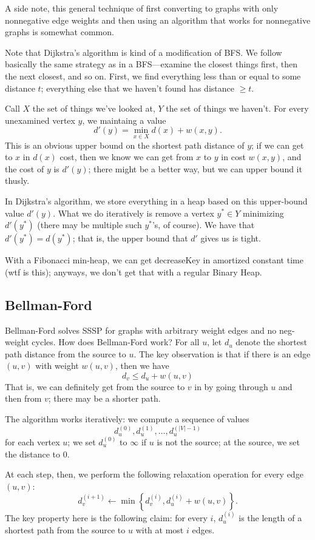 \documentclass{article}
\begin{document}
A side note, this general technique of first converting to graphs with only
nonnegative edge weights and then using an algorithm that works for nonnegative
graphs is somewhat common.


Note that Dijkstra's algorithm is kind of a modification of BFS.
We follow basically the same strategy as in a BFS---examine the closest things
first, then the next closest, and so on.
First, we find everything less than or equal to some distance $t$; everything
else that we haven't found has distance $\geq t$.

Call $X$ the set of things we've looked at, $Y$ the set of things we haven't.
For every unexamined vertex $y$, we maintaing a value
$$
d'(y) = \min_{x\in X} d(x) + w(x,y).
$$
This is an obvious upper bound on the shortest path distance of $y$; if we
can get to $x$ in $d(x)$ cost, then we know we can get from $x$ to $y$ in
cost $w(x,y)$, and the cost of $y$ is $d'(y)$; there might be a 
better way, but we can upper bound it thusly.

In Dijkstra's algorithm, we store everything in a heap based on this
upper-bound value $d'(y)$.
What we do iteratively is remove a vertex $y^*\in Y$ minimizing $d'(y^*)$ (there
may be multiple such $y^*$'s, of course).
We have that $d'(y^*) = d(y^*)$; that is, the upper bound that $d'$ gives
us is tight.

With a Fibonacci min-heap, we can get decreaseKey in amortized constant
time (wtf is this); anyways, we don't get that with a regular Binary Heap.


\subsection{Bellman-Ford}

Bellman-Ford solves SSSP for graphs with arbitrary weight edges and no
neg-weight cycles.
How does Bellman-Ford work?
For all $u$, let $d_u$ denote the shortest path distance from the source to
 $u$.
The key observation is that if there is an edge $(u,v)$ with weight $w(u,v)$,
then we have
$$
d_v \leq d_u + w(u,v)
$$
That is, we can definitely get from the source to $v$ in
by going through $u$ and then from $v$; there may be a shorter
path.

The algorithm works iteratively: we compute a sequence of values
$$
d_u^{(0)}, d_u^{(1)}, \ldots, d_u^{(|V| - 1)}
$$
for each vertex $u$; we set $d_u^{(0)}$ to $\infty$ if $u$ is not the
source; at the source, we set the distance to $0$.

At each step, then, we perform the following relaxation operation for
every edge $(u,v)$:
$$
	d_v^{(i+1)} \leftarrow
		\min\left\{
			d_v^{(i)},
			d_u^{(i)} + w(u,v)
		\right\}.
$$
The key property here is the following claim:
for every $i$, $d_u^{(i)}$ is the length of a shortest path from the
source to $u$ with at most $i$ edges.
\end{document}
